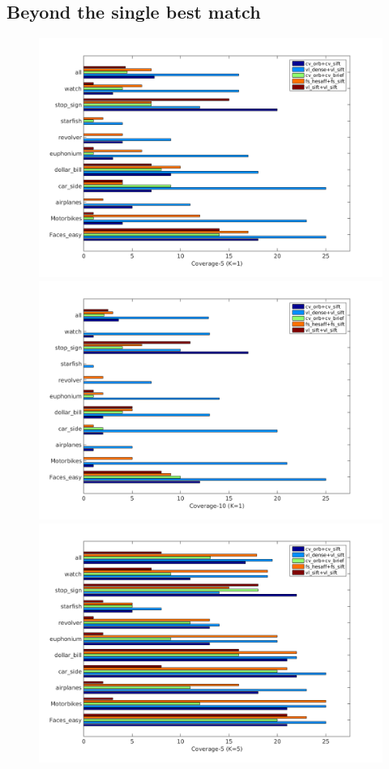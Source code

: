 \documentclass[review]{elsarticle}
\begin{document}
%
\subsection{Beyond the single best match\label{sec:beyondsingle}}
%
\begin{figure}[h!]
\begin{center}
{\includegraphics[height=0.4\linewidth,width=.49\linewidth]{resources/antti_results/BeyondSingleBestmatch/metaPar_Cov5_K1_new.png}}
{\includegraphics[height=0.4\linewidth,width=0.49\linewidth]{resources/antti_results/BeyondSingleBestmatch/metaPar_Cov10_K1_new.png}}\\
{\includegraphics[height=0.4\linewidth,width=0.49\linewidth]{resources/antti_results/BeyondSingleBestmatch/metaPar_Cov5_K5_new.png}}

\end{center}
\end{figure}
\end{document}
